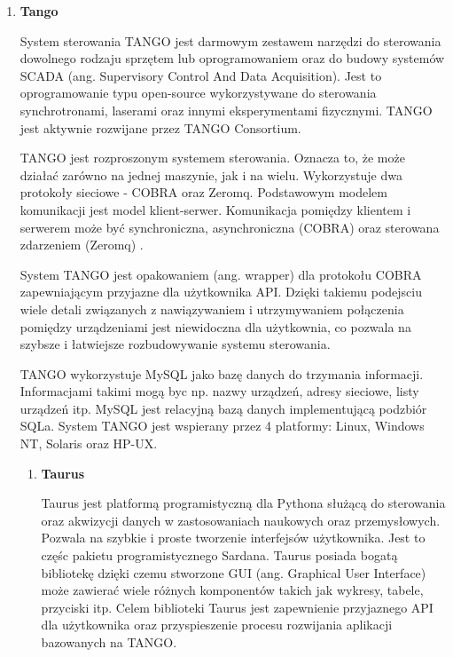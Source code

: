 \begin{enumerate}
	\item \textbf{Tango}
	
	\hspace{2em}System sterowania TANGO jest darmowym zestawem narzędzi do sterowania dowolnego rodzaju sprzętem lub oprogramowaniem oraz do budowy systemów SCADA (ang. Supervisory Control And Data Acquisition). Jest to oprogramowanie typu open-source wykorzystywane do sterowania synchrotronami, laserami oraz innymi eksperymentami fizycznymi. TANGO jest aktywnie rozwijane przez TANGO Consortium.
	
	\hspace{2em}TANGO jest rozproszonym systemem sterowania. Oznacza to, że może działać zarówno na jednej maszynie, jak i na wielu. Wykorzystuje dwa protokoły sieciowe - COBRA oraz Zeromq. Podstawowym modelem komunikacji jest model klient-serwer. Komunikacja pomiędzy klientem i serwerem może być synchroniczna, asynchroniczna (COBRA) oraz sterowana zdarzeniem (Zeromq) \cite{TangoWiki}.
	
	\hspace{2em}System TANGO jest opakowaniem (ang. wrapper) dla protokołu COBRA zapewniającym przyjazne dla użytkownika API. Dzięki takiemu podejsciu wiele detali związanych z nawiązywaniem i utrzymywaniem połączenia pomiędzy urządzeniami jest niewidoczna dla użytkownia, co pozwala na szybsze i łatwiejsze rozbudowywanie systemu sterowania.
	
	\hspace{2em}TANGO wykorzystuje MySQL jako bazę danych do trzymania informacji. Informacjami takimi mogą byc np. nazwy urządzeń, adresy sieciowe, listy urządzeń itp. MySQL jest relacyjną bazą danych implementującą podzbiór SQLa. System TANGO jest wspierany przez 4 platformy: Linux, Windows NT, Solaris oraz HP-UX.
	
	\begin{enumerate}
		\item \textbf{Taurus}
		
		\hspace{2em}Taurus jest platformą programistyczną dla Pythona służącą do sterowania oraz akwizycji danych w zastosowaniach naukowych oraz przemysłowych. Pozwala na szybkie i proste tworzenie interfejsów użytkownika. Jest to częśc pakietu programistycznego Sardana. Taurus posiada bogatą bibliotekę dzięki czemu stworzone GUI (ang. Graphical User Interface)  może zawierać wiele różnych komponentów takich jak wykresy, tabele, przyciski itp. Celem biblioteki Taurus jest zapewnienie przyjaznego API dla użytkownika oraz przyspieszenie procesu rozwijania aplikacji bazowanych na TANGO.
				

\end{enumerate}
\end{enumerate}
